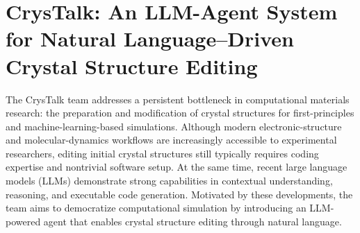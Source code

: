 






\section{CrysTalk: An LLM-Agent System for Natural Language--Driven Crystal Structure Editing}

%

The CrysTalk team addresses a persistent bottleneck in computational materials research: the preparation and modification of crystal structures for first-principles and machine-learning-based simulations. Although modern electronic-structure and molecular-dynamics workflows are increasingly accessible to experimental researchers, editing initial crystal structures still typically requires coding expertise and nontrivial software setup. At the same time, recent large language models (LLMs) demonstrate strong capabilities in contextual understanding, reasoning, and executable code generation. Motivated by these developments, the team aims to democratize computational simulation by introducing an LLM-powered agent that enables crystal structure editing through natural language.


